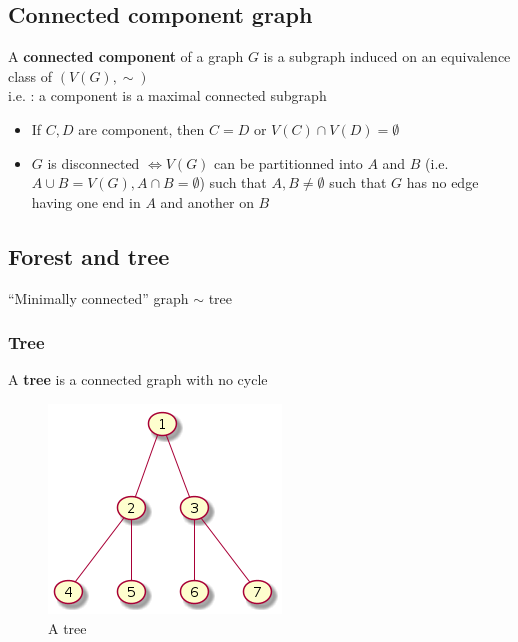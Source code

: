     \subsection{Connected component graph}
        A \textbf{connected component} of a graph $G$ is a subgraph induced on an equivalence class of $(V(G), \sim)$\\
        i.e. : a component is a maximal connected subgraph
        \begin{itemize}
            \item If $C, D$ are component, then $C=D$ or $V(C) \cap V(D) = \emptyset$
            \item $G$ is disconnected $\Leftrightarrow V(G)$ can be partitionned into $A$ and $B$ (i.e. $A\cup B =V(G), A \cap B = \emptyset$) such that $A, B \neq \emptyset$ such that $G$ has no edge having one end in $A$ and another on $B$
        \end{itemize}
    \subsection{Forest and tree}
        ``Minimally connected'' graph $\sim$ tree
        \subsubsection{Tree}
            A \textbf{tree} is a connected graph with no cycle
            \begin{figure}[h]
                \centering
                \includegraphics[scale=0.5]{ressources/images/Tree.png}
                \caption{A tree}
                \label{Tree}
            \end{figure}
